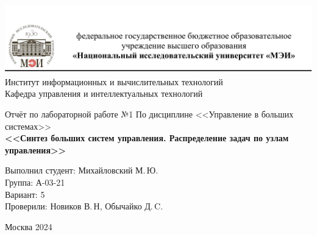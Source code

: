 \begin{titlepage}
	\newpage
	\begin{center}
		\includegraphics[width=\textwidth]{png/tit.png}
		Институт информационных и вычислительных технологий \\
			Кафедра управления и интеллектуальных технологий
		\vspace{1.25cm}
	\end{center}
	
	\vspace{1.2em}
	
	\begin{center}
		\begin{spacing}{1}
			{\Large Отчёт по лабораторной работе №1 \linebreak
			По дисциплине <<Управление в больших системах>> \\}
			\large{\bf<<Синтез больших систем управления. Распределение задач по узлам управления>>}
		\end{spacing}
	\end{center}
	
	\vspace{5em}
	

	\vspace{6em}
	
		\noindent Выполнил студент: Михайловский М.\,Ю. \\
		Группа: А-03-21 \\
		Вариант: 5\\
		Проверили: Новиков В.\,Н, Обычайко Д.\,C.
	
	
	\vspace{\fill}
	
	\begin{center}
		Москва 2024
	\end{center}
	
\end{titlepage}